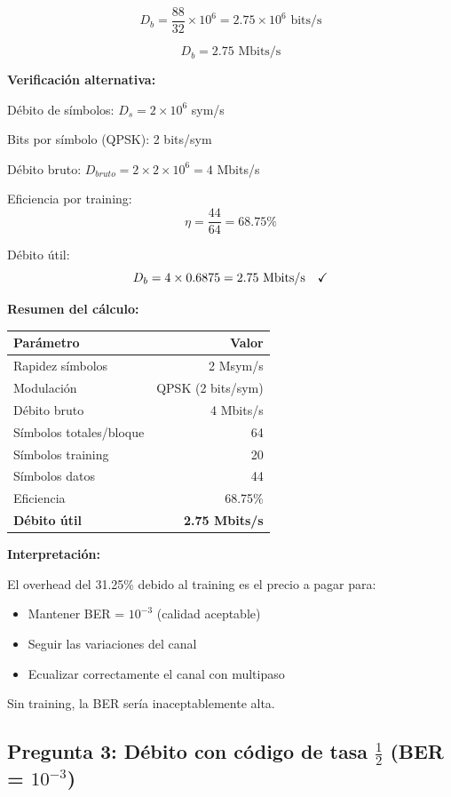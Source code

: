 \documentclass[11pt,a4paper]{article}
\begin{document}
\[
D_b = \frac{88}{32} \times 10^{6} = 2.75 \times 10^{6} \text{ bits/s}
\]

\[
\boxed{D_b = 2.75 \text{ Mbits/s}}
\]

\textbf{Verificaci\'on alternativa:}

D\'ebito de s\'imbolos: $D_s = 2 \times 10^6$ sym/s

Bits por s\'imbolo (QPSK): 2 bits/sym

D\'ebito bruto: $D_{bruto} = 2 \times 2 \times 10^6 = 4$ Mbits/s

Eficiencia por training:
\[
\eta = \frac{44}{64} = 68.75\%
\]

D\'ebito \'util:
\[
D_b = 4 \times 0.6875 = 2.75 \text{ Mbits/s} \quad $\checkmark$
\]

\textbf{Resumen del c\'alculo:}

\begin{center}
\begin{tabular}{|l|r|}
\hline
\textbf{Par\'ametro} & \textbf{Valor} \\
\hline
Rapidez s\'imbolos & 2 Msym/s \\
Modulaci\'on & QPSK (2 bits/sym) \\
D\'ebito bruto & 4 Mbits/s \\
S\'imbolos totales/bloque & 64 \\
S\'imbolos training & 20 \\
S\'imbolos datos & 44 \\
Eficiencia & 68.75\% \\
\textbf{D\'ebito \'util} & \textbf{2.75 Mbits/s} \\
\hline
\end{tabular}
\end{center}

\textbf{Interpretaci\'on:}

El overhead del 31.25\% debido al training es el precio a pagar para:
\begin{itemize}
    \item Mantener BER = $10^{-3}$ (calidad aceptable)
    \item Seguir las variaciones del canal
    \item Ecualizar correctamente el canal con multipaso
\end{itemize}

Sin training, la BER ser\'ia inaceptablemente alta.



\subsection*{Pregunta 3: D\'ebito con c\'odigo de tasa $\frac{1}{2}$ (BER = $10^{-3}$)}
\end{document}
